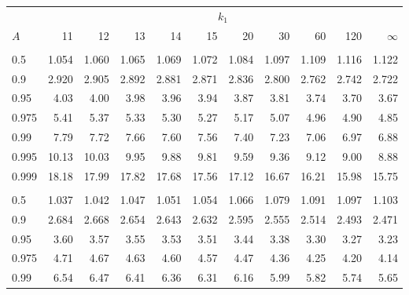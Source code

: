 \documentclass[]{article}
\begin{document}
\begin{table}[H]
\centering
\begin{tabular}{lrrrrrrrrrr}
\toprule
\multicolumn{1}{c}{ } & \multicolumn{10}{c}{$k_1$} \\
\cmidrule(l{3pt}r{3pt}){2-11}
\hspace{1.1em}$A$ & 11 & 12 & 13 & 14 & 15 & 20 & 30 & 60 & 120 & $\infty$\\
\midrule
\addlinespace[0.3em]
\multicolumn{11}{l}{\textbf{$k_2=6$}}\\
\hspace{1em}0.5 & 1.054 & 1.060 & 1.065 & 1.069 & 1.072 & 1.084 & 1.097 & 1.109 & 1.116 & 1.122\\
\hspace{1em}0.9 & 2.920 & 2.905 & 2.892 & 2.881 & 2.871 & 2.836 & 2.800 & 2.762 & 2.742 & 2.722\\
\hspace{1em}0.95 & 4.03 & 4.00 & 3.98 & 3.96 & 3.94 & 3.87 & 3.81 & 3.74 & 3.70 & 3.67\\
\hspace{1em}0.975 & 5.41 & 5.37 & 5.33 & 5.30 & 5.27 & 5.17 & 5.07 & 4.96 & 4.90 & 4.85\\
\hspace{1em}0.99 & 7.79 & 7.72 & 7.66 & 7.60 & 7.56 & 7.40 & 7.23 & 7.06 & 6.97 & 6.88\\
\hspace{1em}0.995 & 10.13 & 10.03 & 9.95 & 9.88 & 9.81 & 9.59 & 9.36 & 9.12 & 9.00 & 8.88\\
\hspace{1em}0.999 & 18.18 & 17.99 & 17.82 & 17.68 & 17.56 & 17.12 & 16.67 & 16.21 & 15.98 & 15.75\\
\addlinespace[0.3em]
\multicolumn{11}{l}{\textbf{$k_2=7$}}\\
\hspace{1em}0.5 & 1.037 & 1.042 & 1.047 & 1.051 & 1.054 & 1.066 & 1.079 & 1.091 & 1.097 & 1.103\\
\hspace{1em}0.9 & 2.684 & 2.668 & 2.654 & 2.643 & 2.632 & 2.595 & 2.555 & 2.514 & 2.493 & 2.471\\
\hspace{1em}0.95 & 3.60 & 3.57 & 3.55 & 3.53 & 3.51 & 3.44 & 3.38 & 3.30 & 3.27 & 3.23\\
\hspace{1em}0.975 & 4.71 & 4.67 & 4.63 & 4.60 & 4.57 & 4.47 & 4.36 & 4.25 & 4.20 & 4.14\\
\hspace{1em}0.99 & 6.54 & 6.47 & 6.41 & 6.36 & 6.31 & 6.16 & 5.99 & 5.82 & 5.74 & 5.65\\

\end{tabular}
\end{table}
\end{document}
